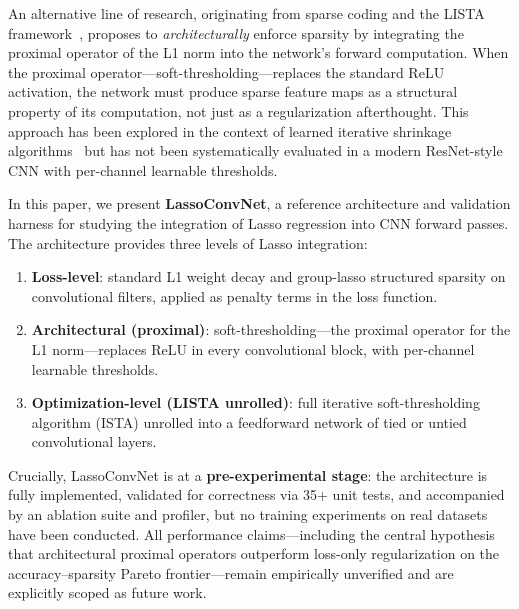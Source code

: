 \documentclass{article}
\begin{document}
An alternative line of research, originating from sparse coding and the LISTA
framework~\cite{gregor2010learning}, proposes to \emph{architecturally} enforce
sparsity by integrating the proximal operator of the L1 norm into the network's
forward computation. When the proximal operator---soft-thresholding---replaces
the standard ReLU activation, the network must produce sparse feature maps as a
structural property of its computation, not just as a regularization afterthought.
This approach has been explored in the context of learned iterative shrinkage
algorithms~\cite{zhang2018ista, xin2016max} but has not been systematically
evaluated in a modern ResNet-style CNN with per-channel learnable thresholds.

In this paper, we present \textbf{LassoConvNet}, a reference architecture and
validation harness for studying the integration of Lasso regression into CNN
forward passes. The architecture provides three levels of Lasso integration:

\begin{enumerate}
    \item \textbf{Loss-level}: standard L1 weight decay and group-lasso structured
          sparsity on convolutional filters, applied as penalty terms in the loss
          function.
    \item \textbf{Architectural (proximal)}: soft-thresholding---the proximal
          operator for the L1 norm---replaces ReLU in every convolutional block,
          with per-channel learnable thresholds.
    \item \textbf{Optimization-level (LISTA unrolled)}: full iterative
          soft-thresholding algorithm (ISTA) unrolled into a feedforward network
          of tied or untied convolutional layers.
\end{enumerate}

Crucially, LassoConvNet is at a \textbf{pre-experimental stage}: the architecture
is fully implemented, validated for correctness via 35+ unit tests, and accompanied
by an ablation suite and profiler, but no training experiments on real datasets
have been conducted. All performance claims---including the central hypothesis that
architectural proximal operators outperform loss-only regularization on the
accuracy--sparsity Pareto frontier---remain empirically unverified and are
explicitly scoped as future work.
\end{document}
